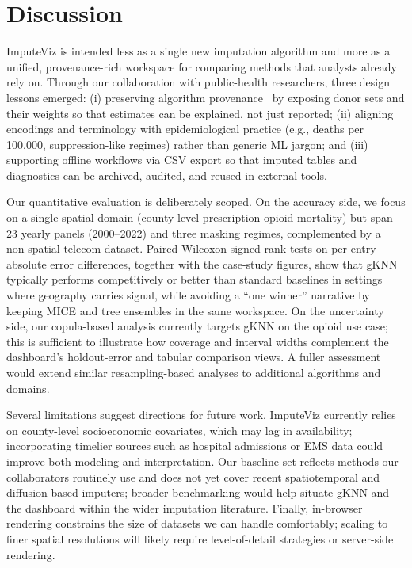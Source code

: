 \documentclass{egpubl}
\newcommand{\tool}{ImputeViz\xspace}
\begin{document}
\section{Discussion}
\label{sec:discussion}

\tool is intended less as a single new imputation algorithm and more as a unified, provenance-rich workspace for comparing methods that analysts already rely on. Through our collaboration with public-health researchers, three design lessons emerged: (i) preserving algorithm provenance~\cite{Ragan2016} by exposing donor sets and their weights so that estimates can be explained, not just reported; (ii) aligning encodings and terminology with epidemiological practice (e.g., deaths per 100{,}000, suppression-like regimes) rather than generic ML jargon; and (iii) supporting offline workflows via CSV export so that imputed tables and diagnostics can be archived, audited, and reused in external tools.

Our quantitative evaluation is deliberately scoped. On the accuracy side, we focus on a single spatial domain (county-level prescription-opioid mortality) but span 23 yearly panels (2000--2022) and three masking regimes, complemented by a non-spatial telecom dataset. Paired Wilcoxon signed-rank tests on per-entry absolute error differences, together with the case-study figures, show that gKNN typically performs competitively or better than standard baselines in settings where geography carries signal, while avoiding a “one winner” narrative by keeping MICE and tree ensembles in the same workspace. On the uncertainty side, our copula-based analysis currently targets gKNN on the opioid use case; this is sufficient to illustrate how coverage and interval widths complement the dashboard’s holdout-error and tabular comparison views. A fuller assessment would extend similar resampling-based analyses to additional algorithms and domains.

Several limitations suggest directions for future work. \tool currently relies on county-level socioeconomic covariates, which may lag in availability; incorporating timelier sources such as hospital admissions or EMS data could improve both modeling and interpretation. Our baseline set reflects methods our collaborators routinely use and does not yet cover recent spatiotemporal and diffusion-based imputers; broader benchmarking would help situate gKNN and the dashboard within the wider imputation literature. Finally, in-browser rendering constrains the size of datasets we can handle comfortably; scaling to finer spatial resolutions will likely require level-of-detail strategies or server-side rendering.
\end{document}
